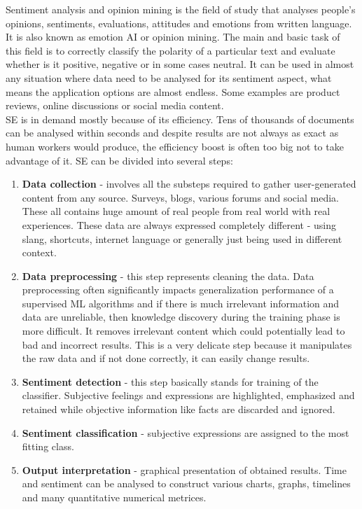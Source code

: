 Sentiment analysis and opinion mining is the field of study that analyses people's opinions, sentiments, evaluations, attitudes and emotions from written language.\cite{liu2012sentiment} It is also known as emotion AI or opinion mining. The main and basic task of this field is to correctly classify the polarity of a particular text and evaluate whether is it positive, negative or in some cases neutral. It can be used in almost any situation where data need to be analysed for its sentiment aspect, what means the application options are almost endless.  Some examples are product reviews, online discussions or social media content.\\
SE is in demand mostly because of its efficiency. Tens of thousands of documents can be analysed within seconds and despite results are not always as exact as human workers would produce, the efficiency boost is often too big not to take advantage of it. SE can be divided into several steps:
\begin{enumerate}
  \item \textbf{Data collection} - involves all the substeps required to gather user-generated content from any source. Surveys, blogs, various forums and social media. These all contains huge amount of real people from real world with real experiences. These data are always expressed completely different - using slang, shortcuts, internet language or generally just being used in different context.
  \item \textbf{Data preprocessing} - this step represents cleaning the data. Data preprocessing often significantly impacts generalization performance of a supervised ML algorithms \cite{kotsiantis2006data} and if there is much irrelevant information and data are unreliable, then knowledge discovery during the training phase is more difficult. It removes irrelevant content which could potentially lead to bad and incorrect results. This is a very delicate step because it manipulates the raw data and if not done correctly, it can easily change results.
  \item \textbf{Sentiment detection} - this step basically stands for training of the classifier. Subjective feelings and expressions are highlighted, emphasized and retained while objective information like facts are discarded and ignored. 
  \item \textbf{Sentiment classification} - subjective expressions are assigned to the most fitting class.
    \item \textbf{Output interpretation} - graphical presentation of obtained results. Time and sentiment can be analysed to construct various charts, graphs, timelines and many quantitative numerical metrices.
\end{enumerate}

